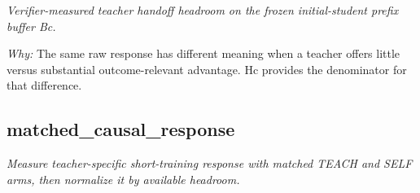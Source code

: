\documentclass[10pt,a4paper]{article}
\begin{document}
\begin{enumerate}[leftmargin=*,start=1]
\noindent\emph{Verifier-measured teacher handoff headroom on the frozen initial-student prefix buffer Bc.}
\par{}
\par\emph{Why:} The same raw response has different meaning when a teacher offers little versus substantial outcome-relevant advantage. Hc provides the denominator for that difference.
\end{enumerate}
\subsection*{matched\_causal\_response}
\emph{Measure teacher-specific short-training response with matched TEACH and SELF arms, then normalize it by available headroom.}
\end{document}
